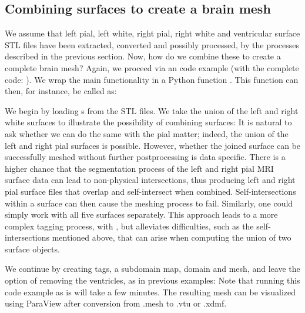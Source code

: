 \subsection{Combining surfaces to create a brain mesh}
We assume that left pial, left white, right pial, right white and
ventricular surface STL files have been extracted, converted and
possibly processed, by the processes described in the previous
section. Now, how do we combine these to create a complete brain mesh?
Again, we proceed via an \svmtk{} code example (with the complete code:
). We wrap the
main functionality in a Python function
. This function can then, for
instance, be called as:

We begin by loading s from the STL files. 
We take the union of the left and right white surfaces to illustrate
the possibility of combining surfaces:
It is natural to ask whether we can do the same with the pial matter;
indeed, the union of the left and right pial surfaces is
possible. However, whether the joined surface can be successfully
meshed without further postprocessing is data specific. There is a
higher chance that the {\freesurfer} segmentation process of the left
and right pial MRI surface data can lead to non-physical
intersections, thus producing left and right pial surface files that
overlap and self-intersect when combined. Self-intersections within a
surface can then cause the meshing process to fail. Similarly, one
could simply work with all five surfaces separately. This approach
leads to a more complex tagging process, with , but
alleviates difficulties, such as the self-intersections mentioned
above, that can arise when computing the union of two surface objects.

We continue by creating tags, a subdomain map, domain and mesh, and
leave the option of removing the ventricles, as in previous examples:
 Note that
running this code example as is will take a few minutes. The resulting
mesh can be visualized using ParaView after conversion from .mesh to
.vtu or .xdmf.

